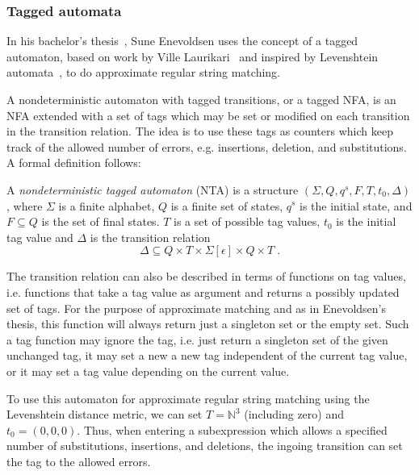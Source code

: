 

\subsubsection{Tagged automata}

In his bachelor's thesis~\cite{enevoldsen2015pattern}, Sune Enevoldsen uses the
concept of a tagged automaton, based on work by Ville
Laurikari~\cite{laurikari2000nfas, laurikari2001efficient} and inspired by
Levenshtein automata~\cite{schulz2002fast}, to do approximate regular string
matching.

A nondeterministic automaton with tagged transitions, or a tagged NFA, is an
NFA extended with a set of tags which may be set or modified on each transition
in the transition relation. The idea is to use these tags as counters which
keep track of the allowed number of errors, e.g.  insertions, deletion, and
substitutions. A formal definition follows:


\begin{definition}[NTA] 
  A \emph{nondeterministic tagged automaton} (NTA) is a structure
  $(\Sigma, Q, q^s, F, T, t_0, \Delta)$, where $\Sigma$ is a finite alphabet,
  $Q$ is a finite set of states, $q^s$ is the initial state, and
  $F \subseteq Q$ is the set of final states. $T$ is a set of possible tag
  values, $t_0$ is the initial tag value and $\Delta$ is the transition
  relation
  \[
    \Delta \subseteq Q \times T \times \Sigma[\epsilon] \times Q \times T \;.
  \]
\end{definition}

The transition relation can also be described in terms of functions on tag
values, i.e. functions that take a tag value as argument and returns a possibly
updated set of tags. For the purpose of approximate matching and as in
Enevoldsen's thesis, this function will always return just a singleton set or
the empty set. Such a tag function may ignore the tag, i.e. just return a
singleton set of the given unchanged tag, it may set a new a new tag
independent of the current tag value, or it may set a tag value depending on
the current value.

To use this automaton for approximate regular string matching using the
Levenshtein distance metric, we can set $T = \mathbb{N}^3$ (including zero) and
$t_0 = (0,0,0)$. Thus, when entering a subexpression which allows a specified
number of substitutions, insertions, and deletions, the ingoing transition can
set the tag to the allowed errors.


